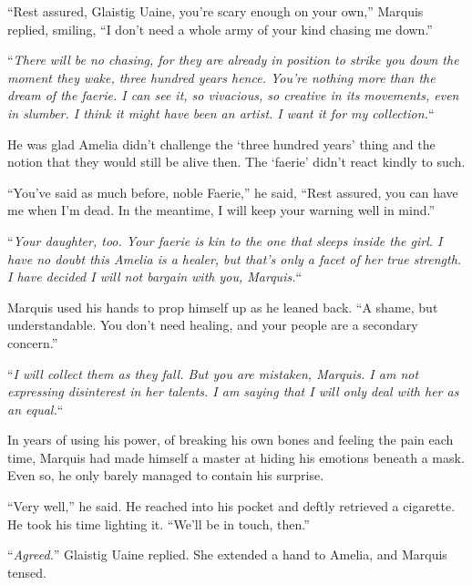 ``Rest assured, Glaistig Uaine, you're scary enough on your own,'' Marquis replied, smiling,  ``I don't need a whole army of your kind chasing me down.''



``\emph{There will be no chasing, for they are already in position to strike you down the moment they wake, three hundred years hence.  You're nothing more than the dream of the faerie.  I can see it, so vivacious, so creative in its movements, even in slumber.  I think it might have been an artist.  I want it for my collection.}``



He was glad Amelia didn't challenge the `three hundred years' thing and the notion that they would still be alive then.  The `faerie' didn't react kindly to such.



``You've said as much before, noble Faerie,'' he said, ``Rest assured, you can have me when I'm dead.  In the meantime, I will keep your warning well in mind.''



``\emph{Your daughter, too.  Your faerie is kin to the one that sleeps inside the girl.  I have no doubt this Amelia is a healer, but that's only a facet of her true strength.  I have decided I will not bargain with you, Marquis.}``



Marquis used his hands to prop himself up as he leaned back.  ``A shame, but understandable.  You don't need healing, and your people are a secondary concern.''



``\emph{I will collect them as they fall.  But you are mistaken, Marquis.  I am not expressing disinterest in her talents.  I am saying that I will only deal with her as an equal.}``



In years of using his power, of breaking his own bones and feeling the pain each time, Marquis had made himself a master at hiding his emotions beneath a mask.  Even so, he only barely managed to contain his surprise.



``Very well,'' he said.  He reached into his pocket and deftly retrieved a cigarette.  He took his time lighting it.  ``We'll be in touch, then.''



``\emph{Agreed.}''  Glaistig Uaine replied.  She extended a hand to Amelia, and Marquis tensed.



